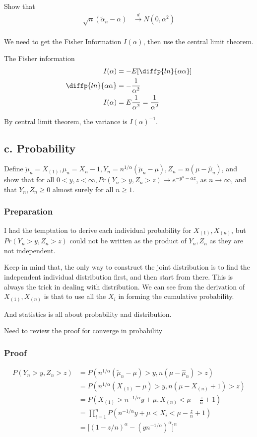 \documentclass[11pt]{article} %
\begin{document}
	Show that 
	\begin{align*}
		\sqrt{n} (\tilde{\alpha}_n - \alpha)& \xrightarrow{d} N(0, \alpha^2)\\
	\end{align*}
	
	We need to get the Fisher Information $I(\alpha)$, then use the central limit theorem. 
	
	The Fisher information
	\begin{align*}
	I(\alpha)&= -E[\diffp{ln}{\alpha \alpha}]\\
	\diffp{ln}{\alpha \alpha} &= -\frac{1}{\alpha^2} \\
	I(\alpha)&= E\frac{1}{\alpha^2}= \frac{1}{\alpha^2} \\
\end{align*}	
	
By central limit theorem, the variance is $I(\alpha)^{-1}$. 


\subsection{c. Probability}	
Define $\tilde{\mu}_n = X_{(1)}, \hat{\mu}_n = X_{n}-1, Y_n = n^{1/\alpha} (\tilde{\mu}_n - \mu), Z_n = n(\mu- \hat{\mu}_n)$, and show that for all $0< y, z < \infty, Pr(Y_n > y, Z_n > z) \rightarrow e^{-y^{\alpha} -\alpha z}$, as $n \rightarrow \infty$, and that $Y_n, Z_n \geq 0$ almost surely for all $n \geq 1$.  

\subsubsection{Preparation}
I had the temptation to derive each individual probability for $X_{(1)}, X_{(n)}$, but $Pr(Y_n > y, Z_n > z)$ could not be written as the product of $Y_n, Z_n$ as they are not independent. 

Keep in mind that, the only way to construct the joint distribution is to find the independent individual distribution first, and then start from there. This is always the trick in dealing with distribution. We can see from the derivation of $X_{(1)}, X_{(n)}$ is that to use all the $X_i$ in forming the cumulative probability.

And statistics is all about probability and distribution.

Need to review the proof for converge in probability 


\subsubsection{Proof}
	\begin{align*}
		P(Y_n > y, Z_n >z) &= P( n^{1/\alpha} (\tilde{\mu}_n - \mu) > y,   n(\mu - \hat{\mu}_n) > z)\\
		&= P( n^{1/\alpha} (X_{(1)} - \mu) > y,   n(\mu - X_{(n)} + 1) > z)\\
		&= P(X_{(1)} > n^{-1/\alpha} y + \mu, X_{(n)} < \mu - \frac{z}{n} + 1)\\
		&=  \prod_{i=1}^n P( n^{-1/\alpha} y + \mu < X_i < \mu - \frac{z}{n} + 1) \\
		&= \Bigg[ (1- z/n)^{\alpha} - (yn^{-1/\alpha})^{\alpha} \Bigg]^n
	\end{align*} 
\end{document}
